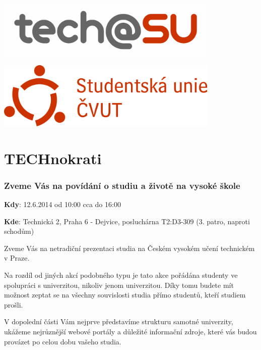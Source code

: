 \documentclass[12pt]{extarticle}[10.3.2013]
\author{Tomáš Kukrál}
\newcommand{\B}[1]{\textbf{{#1}}}
\begin{document}
\pagestyle{empty}

\begin{minipage}[c]{0.5\textwidth}
\begin{center}
	{\includegraphics[width=0.8\textwidth]{logo-obdelnik.png}}
\end{center}
\end{minipage}
\begin{minipage}[c]{0.5\textwidth}
\begin{center}
	{\includegraphics[width=0.8\textwidth]{logo-su.png}}
\end{center}
\end{minipage}

\part*{TECHnokrati}
\section*{Zveme Vás na povídání o studiu a životě na vysoké škole}

\B{Kdy}: 12.6.2014 od 10:00 cca do 16:00

\B{Kde}: Technická 2, Praha 6 - Dejvice, posluchárna T2:D3-309 (3. patro,
naproti schodům)



\vspace{1em}

Zveme Vás na netradiční prezentaci studia na Českém vysokém učení technickém v Praze.

Na rozdíl od jiných akcí podobného typu je tato akce pořádána studenty
ve spolupráci s univerzitou, nikoliv jenom univerzitou. Díky tomu budete mít možnost zeptat se na všechny
souvislosti studia přímo studentů, kteří studiem prošli.

V dopolední části Vám nejprve představíme strukturu samotné univerzity,
ukážeme nejrůznější webové portály a důležité informační zdroje,
které vás budou provázet po celou dobu vašeho studia. 
\end{document}
